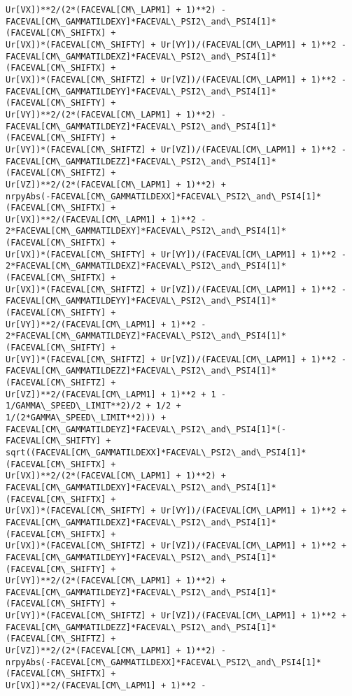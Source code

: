 \documentclass[landscape,letterpaper,10pt,english]{article}
\begin{document}
\begin{Verbatim}[commandchars=\\\{\}]
Ur[VX])**2/(2*(FACEVAL[CM\_LAPM1] + 1)**2) -
FACEVAL[CM\_GAMMATILDEXY]*FACEVAL\_PSI2\_and\_PSI4[1]*(FACEVAL[CM\_SHIFTX] +
Ur[VX])*(FACEVAL[CM\_SHIFTY] + Ur[VY])/(FACEVAL[CM\_LAPM1] + 1)**2 -
FACEVAL[CM\_GAMMATILDEXZ]*FACEVAL\_PSI2\_and\_PSI4[1]*(FACEVAL[CM\_SHIFTX] +
Ur[VX])*(FACEVAL[CM\_SHIFTZ] + Ur[VZ])/(FACEVAL[CM\_LAPM1] + 1)**2 -
FACEVAL[CM\_GAMMATILDEYY]*FACEVAL\_PSI2\_and\_PSI4[1]*(FACEVAL[CM\_SHIFTY] +
Ur[VY])**2/(2*(FACEVAL[CM\_LAPM1] + 1)**2) -
FACEVAL[CM\_GAMMATILDEYZ]*FACEVAL\_PSI2\_and\_PSI4[1]*(FACEVAL[CM\_SHIFTY] +
Ur[VY])*(FACEVAL[CM\_SHIFTZ] + Ur[VZ])/(FACEVAL[CM\_LAPM1] + 1)**2 -
FACEVAL[CM\_GAMMATILDEZZ]*FACEVAL\_PSI2\_and\_PSI4[1]*(FACEVAL[CM\_SHIFTZ] +
Ur[VZ])**2/(2*(FACEVAL[CM\_LAPM1] + 1)**2) +
nrpyAbs(-FACEVAL[CM\_GAMMATILDEXX]*FACEVAL\_PSI2\_and\_PSI4[1]*(FACEVAL[CM\_SHIFTX] +
Ur[VX])**2/(FACEVAL[CM\_LAPM1] + 1)**2 -
2*FACEVAL[CM\_GAMMATILDEXY]*FACEVAL\_PSI2\_and\_PSI4[1]*(FACEVAL[CM\_SHIFTX] +
Ur[VX])*(FACEVAL[CM\_SHIFTY] + Ur[VY])/(FACEVAL[CM\_LAPM1] + 1)**2 -
2*FACEVAL[CM\_GAMMATILDEXZ]*FACEVAL\_PSI2\_and\_PSI4[1]*(FACEVAL[CM\_SHIFTX] +
Ur[VX])*(FACEVAL[CM\_SHIFTZ] + Ur[VZ])/(FACEVAL[CM\_LAPM1] + 1)**2 -
FACEVAL[CM\_GAMMATILDEYY]*FACEVAL\_PSI2\_and\_PSI4[1]*(FACEVAL[CM\_SHIFTY] +
Ur[VY])**2/(FACEVAL[CM\_LAPM1] + 1)**2 -
2*FACEVAL[CM\_GAMMATILDEYZ]*FACEVAL\_PSI2\_and\_PSI4[1]*(FACEVAL[CM\_SHIFTY] +
Ur[VY])*(FACEVAL[CM\_SHIFTZ] + Ur[VZ])/(FACEVAL[CM\_LAPM1] + 1)**2 -
FACEVAL[CM\_GAMMATILDEZZ]*FACEVAL\_PSI2\_and\_PSI4[1]*(FACEVAL[CM\_SHIFTZ] +
Ur[VZ])**2/(FACEVAL[CM\_LAPM1] + 1)**2 + 1 - 1/GAMMA\_SPEED\_LIMIT**2)/2 + 1/2 +
1/(2*GAMMA\_SPEED\_LIMIT**2))) +
FACEVAL[CM\_GAMMATILDEYZ]*FACEVAL\_PSI2\_and\_PSI4[1]*(-FACEVAL[CM\_SHIFTY] +
sqrt((FACEVAL[CM\_GAMMATILDEXX]*FACEVAL\_PSI2\_and\_PSI4[1]*(FACEVAL[CM\_SHIFTX] +
Ur[VX])**2/(2*(FACEVAL[CM\_LAPM1] + 1)**2) +
FACEVAL[CM\_GAMMATILDEXY]*FACEVAL\_PSI2\_and\_PSI4[1]*(FACEVAL[CM\_SHIFTX] +
Ur[VX])*(FACEVAL[CM\_SHIFTY] + Ur[VY])/(FACEVAL[CM\_LAPM1] + 1)**2 +
FACEVAL[CM\_GAMMATILDEXZ]*FACEVAL\_PSI2\_and\_PSI4[1]*(FACEVAL[CM\_SHIFTX] +
Ur[VX])*(FACEVAL[CM\_SHIFTZ] + Ur[VZ])/(FACEVAL[CM\_LAPM1] + 1)**2 +
FACEVAL[CM\_GAMMATILDEYY]*FACEVAL\_PSI2\_and\_PSI4[1]*(FACEVAL[CM\_SHIFTY] +
Ur[VY])**2/(2*(FACEVAL[CM\_LAPM1] + 1)**2) +
FACEVAL[CM\_GAMMATILDEYZ]*FACEVAL\_PSI2\_and\_PSI4[1]*(FACEVAL[CM\_SHIFTY] +
Ur[VY])*(FACEVAL[CM\_SHIFTZ] + Ur[VZ])/(FACEVAL[CM\_LAPM1] + 1)**2 +
FACEVAL[CM\_GAMMATILDEZZ]*FACEVAL\_PSI2\_and\_PSI4[1]*(FACEVAL[CM\_SHIFTZ] +
Ur[VZ])**2/(2*(FACEVAL[CM\_LAPM1] + 1)**2) -
nrpyAbs(-FACEVAL[CM\_GAMMATILDEXX]*FACEVAL\_PSI2\_and\_PSI4[1]*(FACEVAL[CM\_SHIFTX] +
Ur[VX])**2/(FACEVAL[CM\_LAPM1] + 1)**2 -

\end{Verbatim}
\end{document}
